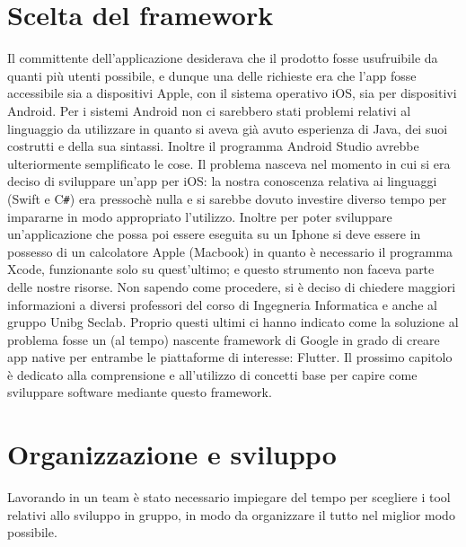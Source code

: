 	\section{Scelta del framework}
	Il committente dell'applicazione desiderava che il prodotto fosse 
	usufruibile  da quanti più utenti possibile, e dunque una delle richieste
	era che l'app fosse accessibile sia a dispositivi Apple, con il sistema
	operativo iOS, sia per dispositivi Android. \newline
	Per i sistemi Android non ci sarebbero stati problemi relativi al linguaggio
	da utilizzare in quanto si aveva già avuto esperienza di Java, dei suoi
	costrutti e della sua sintassi. Inoltre il programma Android Studio avrebbe
	ulteriormente semplificato le cose. Il problema nasceva nel momento in cui
	si era deciso di sviluppare un'app per iOS: la nostra conoscenza relativa
	ai
	linguaggi (Swift e C\verb|#|) era pressochè nulla e si sarebbe dovuto
	investire diverso tempo per impararne in modo appropriato l'utilizzo. 
	Inoltre per poter sviluppare un'applicazione che possa poi essere eseguita su un
	Iphone si deve essere in possesso di un calcolatore Apple (Macbook) in
	quanto è necessario il programma Xcode, funzionante solo su quest'ultimo; e
	questo strumento non faceva parte delle nostre risorse.
	Non
	sapendo come procedere, si è deciso di chiedere maggiori informazioni a
	diversi	professori del corso di Ingegneria Informatica e anche al gruppo
	Unibg Seclab. Proprio questi ultimi ci hanno indicato come la soluzione al
	problema fosse un (al tempo) nascente framework di Google in grado di creare
	app native per entrambe le piattaforme di interesse: Flutter. Il prossimo
	capitolo è dedicato alla comprensione e all'utilizzo di concetti base per
	capire come sviluppare software mediante questo framework.
	
	\section{Organizzazione e sviluppo}
	Lavorando in un team è stato necessario impiegare del tempo per scegliere i 
	tool relativi allo sviluppo in gruppo, in modo da organizzare il tutto nel 
	miglior modo possibile.

